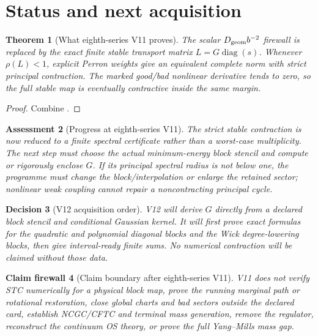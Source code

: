 \documentclass[11pt,oneside]{book}
\newtheorem{theorem}{Theorem}[chapter]
\newtheorem{assessment}[theorem]{Assessment}
\newtheorem{firewall}[theorem]{Claim firewall}
\newtheorem{decision}[theorem]{Decision}
\theoremstyle{definition}
\theoremstyle{remark}
\begin{document}
\section{Status and next acquisition}
\label{sec:e8v11-status}

\begin{theorem}[What eighth-series V11 proves]
\label{thm:e8v11-result}
The scalar \(D_{\rm geom}b^{-2}\) firewall is replaced by the exact
finite stable transport matrix \(L=G\operatorname{diag}(s)\).
Whenever \(\rho(L)<1\), explicit Perron weights give an equivalent
complete norm with strict principal contraction.  The marked
good/bad nonlinear derivative tends to zero, so the full stable map
is eventually contractive inside the same margin.
\end{theorem}

\begin{proof}
Combine
.
\end{proof}

\begin{assessment}[Progress at eighth-series V11]
\label{ass:e8v11-status}
The strict stable contraction is now reduced to a finite spectral
certificate rather than a worst-case multiplicity.  The next step
must choose the actual minimum-energy block stencil and compute or
rigorously enclose \(G\).  If its principal spectral radius is not
below one, the programme must change the block/interpolation or
enlarge the retained sector; nonlinear weak coupling cannot repair a
noncontracting principal cycle.
\end{assessment}

\begin{decision}[V12 acquisition order]
\label{dec:e8v11-V12}
V12 will derive \(G\) directly from a declared block stencil and
conditional Gaussian kernel.  It will first prove exact formulas for
the quadratic and polynomial diagonal blocks and the Wick
degree-lowering blocks, then give interval-ready finite sums.  No
numerical contraction will be claimed without those data.
\end{decision}

\begin{firewall}[Claim boundary after eighth-series V11]
\label{fire:e8v11-claim}
V11 does not verify STC numerically for a physical block map, prove
the running marginal path or rotational restoration, close global
charts and bad sectors outside the declared card, establish
NCGC/CFTC and terminal mass generation, remove the regulator,
reconstruct the continuum OS theory, or prove the full Yang--Mills
mass gap.
\end{firewall}
\end{document}
